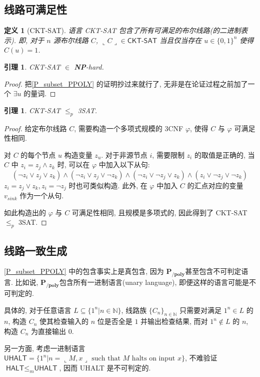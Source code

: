 \documentclass[8pt]{article}
\theoremstyle{compact}
\newtheorem{lemma}[theorem]{引理}
\newtheorem{definition}[theorem]{定义}
\def\le{\leqslant}
\def\rep#1{\llcorner{#1}\lrcorner}
\def\NP{\textbf{NP}}
\def\PPOLY{$\textbf{P}_{\textbf{/poly}}$}
\begin{document}
\subsection{线路可满足性}
\begin{definition}[\textsf{CKT-SAT}]
	语言 \textsf{CKT-SAT} 包含了所有可满足的布尔线路(的二进制表示). 即, 对于 $n$ 源布尔线路 $C$, $\rep{C} \in \textsf{CKT-SAT}$ 当且仅当存在 $u \in \{0, 1\}^n$ 使得 $C(u) = 1$.
\end{definition}
\begin{lemma}
	\textsf{CKT-SAT} $\in$ \NP-hard.
\end{lemma}
\begin{proof}
	把\cref{P_subset_PPOLY} 的证明抄过来就行了, 无非是在论证过程之前加了一个 $\exists u$ 的量词.
\end{proof}
\begin{lemma}
	\textsf{CKT-SAT} $\le_p$ \textsf{3SAT}.
\end{lemma}
\begin{proof}
	给定布尔线路 $C$, 需要构造一个多项式规模的 3CNF $\varphi$, 使得 $C$ 与 $\varphi$ 可满足性相同.

	对 $C$ 的每个节点 $u$ 构造变量 $z_u$. 对于非源节点 $i$, 需要限制 $z_i$ 的取值是正确的, 当 $C$ 中 $z_i = z_j \wedge z_k$ 时, 可以在 $\varphi$ 中加入以下从句: $$(\lnot z_i \vee z_j \vee z_k) \wedge (\lnot z_i \vee z_j \vee \lnot z_k) \wedge (\lnot z_i \vee \lnot z_j \vee z_k) \wedge (z_i \vee \lnot z_j \vee \lnot z_k)$$
	$z_i = z_j \vee z_k, z_i = \lnot z_j$ 时也可类似构造. 此外, 在 $\varphi$ 中加入 $C$ 的汇点对应的变量 $v_{sink}$ 作为一个从句.

	如此构造出的 $\varphi$ 与 $C$ 可满足性相同, 且规模是多项式的, 因此得到了 \textsf{CKT-SAT} $\le_p$ \textsf{3SAT}.
\end{proof}

\subsection{线路一致生成}
\cref{P_subset_PPOLY} 中的包含事实上是真包含, 因为 \PPOLY 甚至包含不可判定语言. 比如说, \PPOLY 包含所有一进制语言(unary language), 即便这样的语言可能是不可判定的.

具体的, 对于任意语言 $L \subseteq \{1^n | n \in \mathbb N\}$, 线路族 $\{C_n\}_{n \in \mathbb N}$ 只需要对满足 $1^n \in L$ 的 $n$, 构造 $C_n$ 使其检查输入的 $n$ 位是否全是 $1$ 并输出检查结果, 而对 $1^n \notin L$ 的 $n$, 构造 $C_n$ 为直接输出 $0$.

另一方面, 考虑一进制语言 $\textsf{UHALT} = \{1^n | n = \rep{M, x} \text{ such that } M \text{ halts on input } x\}$, 不难验证 $\textsf{HALT} \le_m \textsf{UHALT}$, 因而 \textsf{UHALT} 是不可判定的.
\end{document}
